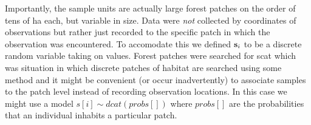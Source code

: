 Importantly,
the sample units are actually large forest patches on the order of
tens of ha each, but variable in size. Data were {\it not} collected
by coordinates of observations but rather just recorded to the
specific patch in which the observation was encountered. To accomodate
this we defined ${\bf s}_{i}$ to be a discrete random variable taking
on values.  Forest patches were searched for scat which was situation
in which discrete patches of habitat are searched using some method
and it might be convenient (or occur inadvertently) to associate
samples to the patch level instead of recording observation
locations. In this case we might use a model $s[i] \sim dcat(probs[])$
where $probs[]$ are the probabilities that an individual inhabits a
particular patch.

